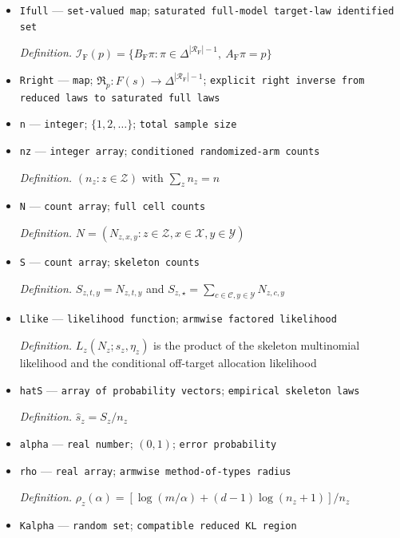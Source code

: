 \documentclass{article}
\begin{document}
\begin{itemize}
  \item \texttt{Ifull} --- \texttt{set-\allowbreak{}valued map}; \texttt{saturated full-\allowbreak{}model target-\allowbreak{}law identified set}
  \par\smallskip\noindent\emph{Definition.} \(\mathcal I_{\mathrm F}(p)=\{B_{\mathrm F}\pi:\pi\in\Delta^{|\mathcal R_{\mathrm F}|-1},\ A_{\mathrm F}\pi=p\}\)
  \item \texttt{Rright} --- \texttt{map}; \(\mathfrak R_{p}:F(s)\to\Delta^{|\mathcal R_{\mathrm F}|-1}\); \texttt{explicit right inverse from reduced laws to saturated full laws}
  \item \texttt{n} --- \texttt{integer}; \(\{1,2,\ldots\}\); \texttt{total sample size}
  \item \texttt{nz} --- \texttt{integer array}; \texttt{conditioned randomized-\allowbreak{}arm counts}
  \par\smallskip\noindent\emph{Definition.} \((n_z:z\in\mathcal Z)\) with \(\sum_z n_z=n\)
  \item \texttt{N} --- \texttt{count array}; \texttt{full cell counts}
  \par\smallskip\noindent\emph{Definition.} \(N=(N_{z,x,y}:z\in\mathcal Z,x\in\mathcal X,y\in\mathcal Y)\)
  \item \texttt{S} --- \texttt{count array}; \texttt{skeleton counts}
  \par\smallskip\noindent\emph{Definition.} \(S_{z,t,y}=N_{z,t,y}\) and \(S_{z,\star}=\sum_{c\in\mathcal C,y\in\mathcal Y}N_{z,c,y}\)
  \item \texttt{Llike} --- \texttt{likelihood function}; \texttt{armwise factored likelihood}
  \par\smallskip\noindent\emph{Definition.} \(L_z(N_z;s_z,\eta_z)\) is the product of the skeleton multinomial likelihood and the conditional off-target allocation likelihood
  \item \texttt{hatS} --- \texttt{array of probability vectors}; \texttt{empirical skeleton laws}
  \par\smallskip\noindent\emph{Definition.} \(\widehat s_z=S_z/n_z\)
  \item \texttt{alpha} --- \texttt{real number}; \((0,1)\); \texttt{error probability}
  \item \texttt{rho} --- \texttt{real array}; \texttt{armwise method-\allowbreak{}of-\allowbreak{}types radius}
  \par\smallskip\noindent\emph{Definition.} \(\rho_z(\alpha)=[\log(m/\alpha)+(d-1)\log(n_z+1)]/n_z\)
  \item \texttt{Kalpha} --- \texttt{random set}; \texttt{compatible reduced KL region}

\end{itemize}
\end{document}
